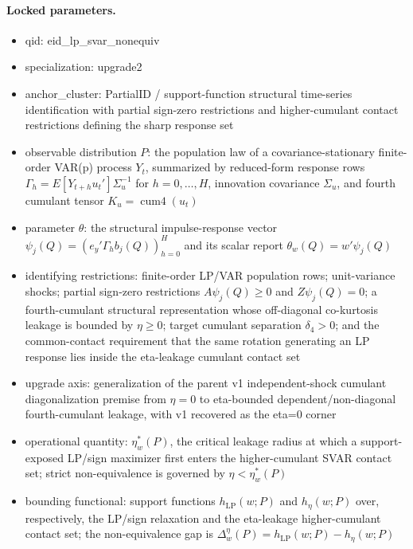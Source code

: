 \documentclass[11pt]{article}
\theoremstyle{definition}
\theoremstyle{plain}
\theoremstyle{remark}
\begin{document}
\paragraph{Locked parameters.}
\begin{itemize}[leftmargin=*]
  \item qid: eid\_lp\_svar\_nonequiv
  \item specialization: upgrade2
  \item anchor\_cluster: PartialID / support-function structural time-series identification with partial sign-zero restrictions and higher-cumulant contact restrictions defining the sharp response set
  \item observable distribution \(P\): the population law of a covariance-stationary finite-order VAR(p) process \(Y_t\), summarized by reduced-form response rows \(\Gamma_h = E[Y_{t+h} u_t'] \Sigma_u^{-1}\) for \(h=0,\ldots,H\), innovation covariance \(\Sigma_u\), and fourth cumulant tensor \(K_u = \operatorname{cum4}(u_t)\)
  \item parameter \(\theta\): the structural impulse-response vector \(\psi_j(Q)=(e_y' \Gamma_h b_j(Q))_{h=0}^H\) and its scalar report \(\theta_w(Q)=w' \psi_j(Q)\)
  \item identifying restrictions: finite-order LP/VAR population rows; unit-variance shocks; partial sign-zero restrictions \(A \psi_j(Q) \ge 0\) and \(Z \psi_j(Q)=0\); a fourth-cumulant structural representation whose off-diagonal co-kurtosis leakage is bounded by \(\eta \ge 0\); target cumulant separation \(\delta_4 > 0\); and the common-contact requirement that the same rotation generating an LP response lies inside the eta-leakage cumulant contact set
  \item upgrade axis: generalization of the parent v1 independent-shock cumulant diagonalization premise from \(\eta=0\) to eta-bounded dependent/non-diagonal fourth-cumulant leakage, with v1 recovered as the eta=0 corner
  \item operational quantity: \(\eta_w^*(P)\), the critical leakage radius at which a support-exposed LP/sign maximizer first enters the higher-cumulant SVAR contact set; strict non-equivalence is governed by \(\eta < \eta_w^*(P)\)
  \item bounding functional: support functions \(h_{\mathrm{LP}}(w;P)\) and \(h_\eta(w;P)\) over, respectively, the LP/sign relaxation and the eta-leakage higher-cumulant contact set; the non-equivalence gap is \(\Delta_w^\eta(P)=h_{\mathrm{LP}}(w;P)-h_\eta(w;P)\)
\end{itemize}
\end{document}

